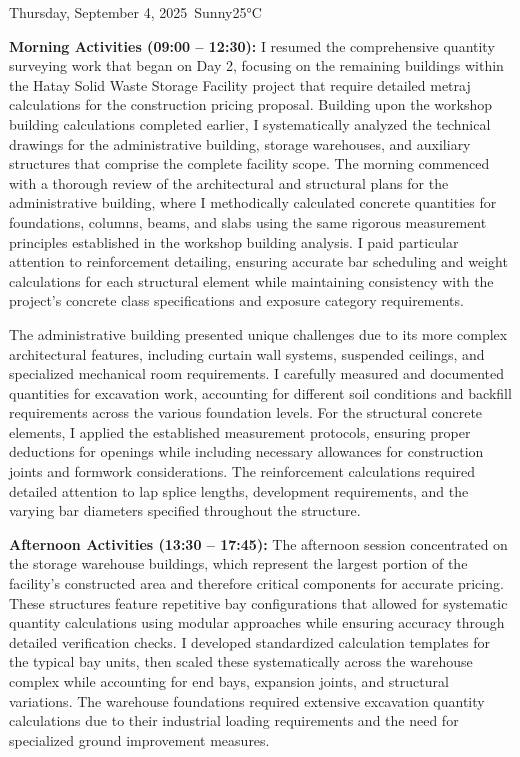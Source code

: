\begin{dailyentry}{Thursday, September 4, 2025}{\weathersunny\ Sunny}{25°C}

\begin{workcontent}
\textbf{Morning Activities (09:00 – 12:30):} I resumed the comprehensive quantity surveying work that began on Day 2, focusing on the remaining buildings within the Hatay Solid Waste Storage Facility project that require detailed metraj calculations for the construction pricing proposal. Building upon the workshop building calculations completed earlier, I systematically analyzed the technical drawings for the administrative building, storage warehouses, and auxiliary structures that comprise the complete facility scope. The morning commenced with a thorough review of the architectural and structural plans for the administrative building, where I methodically calculated concrete quantities for foundations, columns, beams, and slabs using the same rigorous measurement principles established in the workshop building analysis. I paid particular attention to reinforcement detailing, ensuring accurate bar scheduling and weight calculations for each structural element while maintaining consistency with the project's concrete class specifications and exposure category requirements.

The administrative building presented unique challenges due to its more complex architectural features, including curtain wall systems, suspended ceilings, and specialized mechanical room requirements. I carefully measured and documented quantities for excavation work, accounting for different soil conditions and backfill requirements across the various foundation levels. For the structural concrete elements, I applied the established measurement protocols, ensuring proper deductions for openings while including necessary allowances for construction joints and formwork considerations. The reinforcement calculations required detailed attention to lap splice lengths, development requirements, and the varying bar diameters specified throughout the structure.

\textbf{Afternoon Activities (13:30 – 17:45):} The afternoon session concentrated on the storage warehouse buildings, which represent the largest portion of the facility's constructed area and therefore critical components for accurate pricing. These structures feature repetitive bay configurations that allowed for systematic quantity calculations using modular approaches while ensuring accuracy through detailed verification checks. I developed standardized calculation templates for the typical bay units, then scaled these systematically across the warehouse complex while accounting for end bays, expansion joints, and structural variations. The warehouse foundations required extensive excavation quantity calculations due to their industrial loading requirements and the need for specialized ground improvement measures.


\end{workcontent}
\end{dailyentry}

